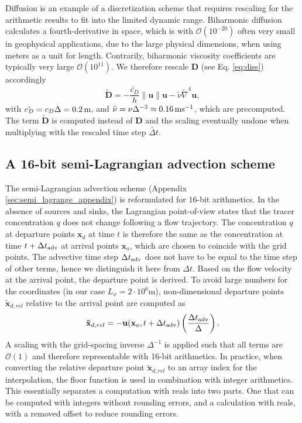 Diffusion is an example of a discretization scheme that requires rescaling for the arithmetic results to fit into the limited dynamic range.
Biharmonic diffusion \citep{Griffies2000} calculates a fourth-derivative in space, which is with $\mathcal{O}(10^{-20})$ often very small in
geophysical applications, due to the large physical dimensions, when using meters as a unit for length. Contrarily, biharmonic viscosity
coefficients are typically very large
$\mathcal{O}(10^{11})$.
We therefore rescale $\mathbf{D}$ (see Eq. \ref{eq:diss}) accordingly
\begin{equation}
\tilde{\mathbf{D}} =-\frac{\tilde{c_D}}{h}\| \mathbf{u} \| \mathbf{u} -
\tilde{\nu}\tilde{\nabla}^4\mathbf{u},
\end{equation}
with $\tilde{c_D} = c_D\Delta = 0.2\operatorname{m}$,  and $\tilde{\nu} = \nu\Delta^{-3}
\approx 0.16\operatorname{ms}^{-1}$, which are precomputed. The term
$\tilde{\mathbf{D}}$ is computed instead of $\mathbf{D}$ and the scaling eventually
undone when multiplying with the rescaled time step $\tilde{\Delta t}$.


\subsection{A 16-bit semi-Lagrangian advection scheme}
\label{sec:swm_semilagrange}

The semi-Lagrangian advection scheme (Appendix \ref{sec:semi_lagrange_appendix}) is reformulated for 16-bit arithmetics.
In the absence of sources and sinks, the Lagrangian point-of-view states that the tracer concentration $q$ does not change
following a flow trajectory. The concentration $q$ at departure points $\mathbf{x}_d$ at time $t$ is therefore the same as the
concentration at time $t+\Delta t_{\operatorname{adv}}$ at arrival points $\mathbf{x}_a$, which are chosen to coincide with the grid points.
The advective time step $\Delta t_{\operatorname{adv}}$ does not have to be equal to the time step of other terms, hence we
distinguish it here from $\Delta t$. Based on the flow velocity at the arrival point, the departure point is derived. To avoid
large numbers for the coordinates (in our case $L_x = 2 \cdot 10^6$m), non-dimensional departure points
$\mathbf{\tilde{x}}_{d,rel}$ relative to the arrival point are computed as
\begin{equation}
\mathbf{\tilde{x}}_{d,rel} = - \mathbf{u}(\mathbf{x}_a,t+\Delta t_{\operatorname{adv}})
\left( \frac{\Delta t_{\operatorname{adv}}}{\Delta} \right).
\label{eq:relcoord}
\end{equation}
A scaling with the grid-spacing inverse $\Delta^{-1}$ is applied such that all terms are $\mathcal{O}(1)$ and therefore
representable with 16-bit arithmetics. In practice, when converting the relative departure point $\mathbf{\tilde{x}}_{d,rel}$
to an array index for the interpolation, the floor function is used in combination with integer arithmetics. This essentially
separates a computation with reals into two parts. One that can be computed with integers without rounding errors,
and a calculation with reals, with a removed offset to reduce rounding errors.

